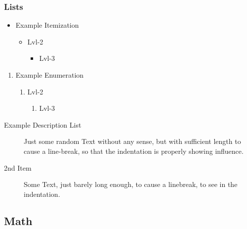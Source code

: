 \begin{frame}
	\frametitle{Lists}
	\begin{minipage}[t]{0.48\linewidth}
		\begin{itemize}
		\item Example Itemization
			\begin{itemize}
			\item%
				Lvl-2
				\begin{itemize}
				\item%
					Lvl-3
				\end{itemize}
			\end{itemize}
		\end{itemize}
	\end{minipage}
	\hfill
	\begin{minipage}[t]{0.48\linewidth}
		\begin{enumerate}
		\item Example Enumeration
			\begin{enumerate}
			\item%
				Lvl-2
				\begin{enumerate}
				\item%
					Lvl-3
				\end{enumerate}
			\end{enumerate}
		\end{enumerate}
	\end{minipage}
	
	\begin{description}
	\item[Example Description List]%
		Just some random Text without any sense, but with sufficient length to cause a line-break, so that the indentation is properly showing influence.
	\item[2nd Item] Some Text, just barely long enough, to cause a linebreak, to see in the indentation.
	\end{description}
\end{frame}




\subsection{Math}

